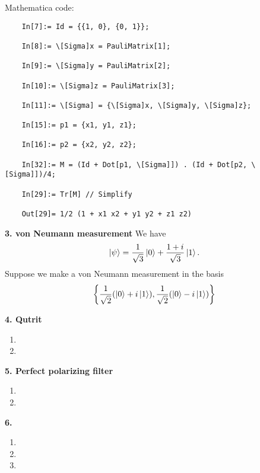 \documentclass{article}
\theoremstyle{definition}
\newcommand{\f}[2]{\frac{#1}{#2}}
\newcommand{\lc}{\left\{}
\newcommand{\rc}{\right\}}
\begin{document}
\begin{enumerate}[label=(\alph*)]
	
	
	


Mathematica code:
\begin{lstlisting}
	In[7]:= Id = {{1, 0}, {0, 1}};
	
	In[8]:= \[Sigma]x = PauliMatrix[1];
	
	In[9]:= \[Sigma]y = PauliMatrix[2];
	
	In[10]:= \[Sigma]z = PauliMatrix[3];
	
	In[11]:= \[Sigma] = {\[Sigma]x, \[Sigma]y, \[Sigma]z};
	
	In[15]:= p1 = {x1, y1, z1};
	
	In[16]:= p2 = {x2, y2, z2};
	
	In[32]:= M = (Id + Dot[p1, \[Sigma]]) . (Id + Dot[p2, \[Sigma]])/4;
	
	In[29]:= Tr[M] // Simplify
	
	Out[29]= 1/2 (1 + x1 x2 + y1 y2 + z1 z2)
\end{lstlisting}
\end{enumerate}


\noindent \textbf{3. \textbf{von Neumann measurement}}
We have 
\begin{align*}
	\ket{\psi} = \f{1}{\sqrt{3}} \ket{0} + \f{1+i}{\sqrt{3}} \ket{1}.
\end{align*} 
Suppose we make a von Neumann measurement in the basis 
\begin{align*}
	\lc \f{1}{\sqrt{2}} (\ket{0} + i\ket{1}), \f{1}{\sqrt{2}} (\ket{0} - i\ket{1})     \rc
\end{align*}


\noindent \textbf{4. Qutrit}

\begin{enumerate}[label=(\alph*)]
	\item 
	
	\item 
\end{enumerate}

\noindent \textbf{5. Perfect polarizing filter } 

\begin{enumerate}[label=(\alph*)]
	\item 
	
	\item 
\end{enumerate}

\noindent \textbf{6. }

\begin{enumerate}[label=(\alph*)]
	\item 
	
	\item 
	
	\item 
\end{enumerate}
\end{document}
